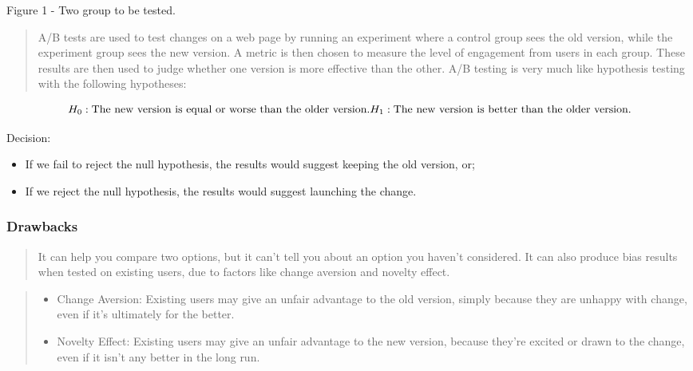 \documentclass[]{book}
\providecommand{\tightlist}{%
  \setlength{\itemsep}{0pt}\setlength{\parskip}{0pt}}
\begin{document}
Figure 1 - Two group to be tested.

\begin{quote}
A/B tests are used to test changes on a web page by running an
experiment where a control group sees the old version, while the
experiment group sees the new version. A metric is then chosen to
measure the level of engagement from users in each group. These results
are then used to judge whether one version is more effective than the
other. A/B testing is very much like hypothesis testing with the
following hypotheses:
\end{quote}

\[H_0 : \text{The new version is equal or worse than the older version.} \\
 H_1 : \text{The new version is better than the older version.} \]

Decision:

\begin{itemize}
\tightlist
\item
  If we fail to reject the null hypothesis, the results would suggest
  keeping the old version, or;
\item
  If we reject the null hypothesis, the results would suggest launching
  the change.
\end{itemize}

\subsubsection*{Drawbacks}\label{drawbacks}

\begin{quote}
It can help you compare two options, but it can't tell you about an
option you haven't considered. It can also produce bias results when
tested on existing users, due to factors like change aversion and
novelty effect.
\end{quote}

\begin{quote}
\begin{itemize}
\tightlist
\item
  Change Aversion: Existing users may give an unfair advantage to the
  old version, simply because they are unhappy with change, even if it's
  ultimately for the better.
\item
  Novelty Effect: Existing users may give an unfair advantage to the new
  version, because they're excited or drawn to the change, even if it
  isn't any better in the long run.
\end{itemize}
\end{quote}
\end{document}
